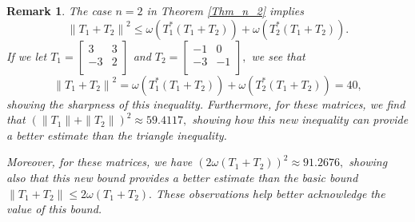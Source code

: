 \documentclass[12pt,twoside,reqno]{amsart}
\newtheorem{remark}{Remark}[section]
\numberwithin{equation}{section}
\begin{document}
\begin{remark}\label{Rem_1}
The case $n=2$ in Theorem \ref{Thm_n_2} implies
	\[{{\left\| {{T}_{1}}+{{T}_{2}} \right\|}^{2}}\le \omega \left( T_{1}^{*}\left( {{T}_{1}}+{{T}_{2}} \right) \right)+\omega \left( T_{2}^{*}\left( {{T}_{1}}+{{T}_{2}} \right) \right).\]
	If we let $T_1=\left[
\begin{array}{cc}
 3 & 3 \\
 -3 & 2 \\
\end{array}
\right]$ and $T_2=\left[
\begin{array}{cc}
 -1 & 0 \\
 -3 & -1 \\
\end{array}
\right],$ we see that 
\[{{\left\| {{T}_{1}}+{{T}_{2}} \right\|}^{2}}= \omega \left( T_{1}^{*}\left( {{T}_{1}}+{{T}_{2}} \right) \right)+\omega \left( T_{2}^{*}\left( {{T}_{1}}+{{T}_{2}} \right) \right)=40,\]
showing the sharpness of this inequality. Furthermore, for these matrices, we find that
$(\|T_1\|+\|T_2\|)^2\approx 59.4117,$ showing how this new inequality can provide a better estimate than the triangle inequality.

Moreover, for these matrices, we have $(2\omega(T_1+T_2))^2\approx 91.2676,$ showing also that this new bound provides a better estimate than the basic bound $\|T_1+T_2\|\leq 2\omega(T_1+T_2).$ These observations help better acknowledge the value of this bound.
\end{remark}
\end{document}
